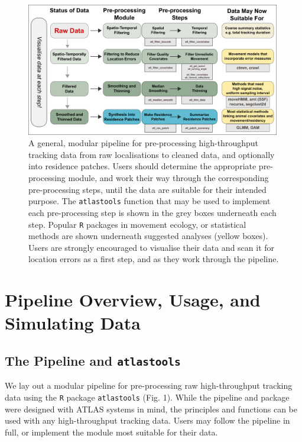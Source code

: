 \documentclass[10pt,paper=a4,headings=standardclasses
]{scrartcl}
\begin{document}
\begin{figure}
    \centering
    \includegraphics[width=0.99\textwidth]{figures/fig_01_recipe.png}
    \caption{A general, modular pipeline for pre-processing high-throughput tracking data from raw localisations to cleaned data, and optionally into residence patches. 
    Users should determine the appropriate pre-processing module, and work their way through the corresponding pre-processing steps, until the data are suitable for their intended purpose.
    The \texttt{atlastools} function that may be used to implement each pre-processing step is shown in the grey boxes underneath each step.
    Popular \texttt{R} packages in movement ecology, or statistical methods are shown underneath suggested analyses (yellow boxes).
    Users are strongly encouraged to visualise their data and scan it for location errors as a first step, and as they work through the pipeline.
    }
    \label{fig:figure_pipeline}
\end{figure}

\section{Pipeline Overview, Usage, and Simulating Data}

\subsection{The Pipeline and \texttt{atlastools}}

We lay out a modular pipeline for pre-processing raw high-throughput tracking data using the \texttt{R} package \texttt{atlastools} (Fig. 1).
While the pipeline and package were designed with ATLAS systems in mind, the principles and functions can be used with any high-throughput tracking data.
Users may follow the pipeline in full, or implement the module most suitable for their data.
\end{document}
